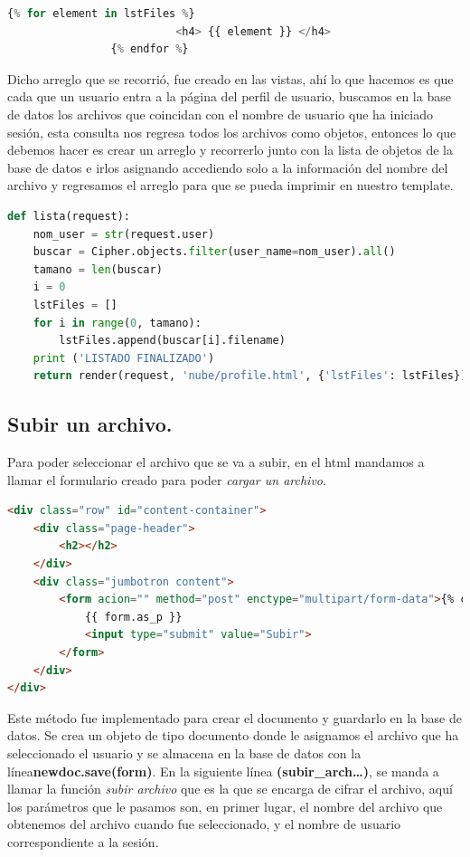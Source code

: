 \begin{lstlisting}[language=Python,frame=single, keywordstyle=\color{blue},breaklines=true]
		{% for element in lstFiles %}
                	      <h4> {{ element }} </h4>
            	{% endfor %}
\end{lstlisting}

Dicho arreglo que se recorrió, fue creado en las vistas, ahí lo que hacemos es que cada que un usuario entra a la página del perfil de usuario, buscamos en la base de datos los archivos que coincidan con el nombre de usuario que ha iniciado sesión, esta consulta nos regresa todos los archivos como objetos, entonces lo que debemos hacer es crear un arreglo y recorrerlo junto con la lista de objetos de la base de datos e irlos asignando accediendo solo a la información del nombre del archivo y regresamos el arreglo para que se pueda imprimir en nuestro template.

\begin{lstlisting}[language=Python,frame=single, keywordstyle=\color{blue},breaklines=true, showstringspaces=false]
def lista(request):
    nom_user = str(request.user)
    buscar = Cipher.objects.filter(user_name=nom_user).all()
    tamano = len(buscar)
    i = 0
    lstFiles = []
    for i in range(0, tamano):
        lstFiles.append(buscar[i].filename)
    print ('LISTADO FINALIZADO')
    return render(request, 'nube/profile.html', {'lstFiles': lstFiles})

\end{lstlisting}

\subsection{Subir un archivo. } 
Para poder seleccionar el archivo que se va a subir, en el html mandamos a llamar el formulario creado para poder \textit{cargar un archivo}.

\begin{lstlisting}[language=HTML,frame=single, keywordstyle=\color{blue},breaklines=true]
<div class="row" id="content-container">
	<div class="page-header">
		<h2></h2>
	</div>
	<div class="jumbotron content">
		<form acion="" method="post" enctype="multipart/form-data">{% csrf_token %}
			{{ form.as_p }}
			<input type="submit" value="Subir">
		</form>
	</div>
</div>
\end{lstlisting}


Este método fue implementado para crear el documento y guardarlo en la base de datos. Se crea un objeto de tipo documento donde le asignamos el archivo que ha seleccionado el usuario y se almacena en la base de datos con la línea\textbf{newdoc.save(form)}.
En la siguiente línea \textbf{(subir\_arch…)}, se manda a llamar la función \textit{subir archivo} que es la que se encarga de cifrar el archivo, aquí los parámetros que le pasamos son, en primer lugar, el nombre del archivo que obtenemos del archivo cuando fue seleccionado, y el nombre de usuario correspondiente a la sesión.

